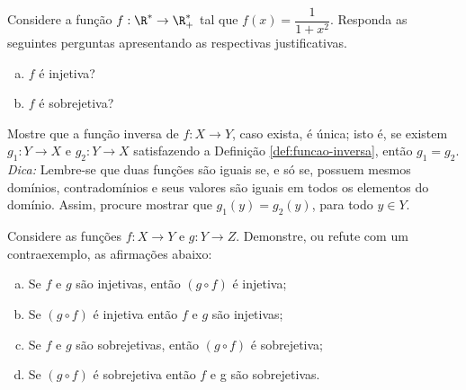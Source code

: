 \begin{exercise}
    Considere a função $f: \R^\ast \to \R^\ast_+$ tal que $f(x) = \dfrac{1}{1+x^2}$. Responda as seguintes perguntas apresentando as respectivas justificativas.
    \begin{enumerate}[a)]
        \item $f$ é injetiva?
	\item $f$ é sobrejetiva?
    \end{enumerate}
\end{exercise}

\begin{exercise}
Mostre que a função inversa de $f: X \to Y$, caso exista, é
única; isto é, se existem $g_1 : Y \to X$ e $g_2 : Y \to X$
satisfazendo a Definição \ref{def:funcao-inversa}, então $g_1 = g_2$.\\
\emph{Dica: } Lembre-se que duas funções são iguais se, e só se,
possuem mesmos domínios, contradomínios e seus valores são iguais em
todos os elementos do domínio. Assim, procure mostrar que $g_1 (y) =
g_2 (y)$, para todo $y \in Y$.
\end{exercise}

\begin{exercise}
  Considere as funções $f: X \to Y$ e $g: Y \to Z$. Demonstre, ou refute com um contraexemplo, as afirmações abaixo:
\begin{enumerate}[(a)]
\item Se $f$ e $g$ são injetivas, então $(g \circ f)$ é injetiva;
\item Se $(g \circ f)$ é injetiva então $f$ e $g$ são injetivas;
\item Se $f$ e $g$ são sobrejetivas, então $(g \circ f)$ é sobrejetiva;
\item Se $(g \circ f)$ é sobrejetiva então $f$ e g são sobrejetivas.
\end{enumerate}
\end{exercise}

